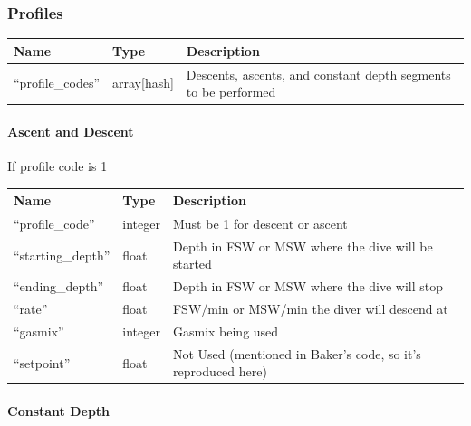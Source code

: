 \documentclass[12pt]{article}
\begin{document}
\subsubsection{Profiles}
\begin{longtable}{|l|l|p{5cm}|}
\hline
 Name                &  Type         &  Description                                          \\
\hline
 ``profile\_codes''  &  array[hash]  &  Descents, ascents, and constant depth segments to be performed  \\
\hline
\end{longtable}

\paragraph{Ascent and Descent}

If profile code is 1

\begin{longtable}{|l|l|p{5cm}|}
\hline
 Name                 &  Type     &  Description                                         \\
\hline
 ``profile\_code''    &  integer  &  Must be 1 for descent or ascent                               \\
\hline
 ``starting\_depth''  &  float    &  Depth in FSW or MSW where the dive will be started  \\
\hline
 ``ending\_depth''    &  float    &  Depth in FSW or MSW where the dive will stop        \\
\hline
 ``rate''             &  float    &  FSW/min or MSW/min the diver will descend at        \\
\hline
 ``gasmix''           &  integer  &  Gasmix being used                                   \\
\hline
 ``setpoint''         &  float    &  Not Used (mentioned in Baker's code, so it's reproduced here)                                             \\
\hline
\end{longtable}

\paragraph{Constant Depth}
\end{document}
